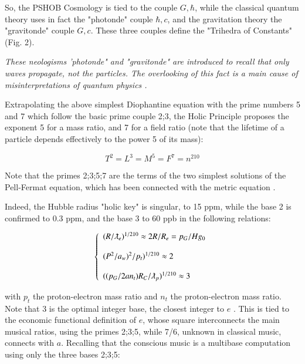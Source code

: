 \documentclass[a4paper,9pt]{article}
\begin{document}
So, the PSHOB Cosmology is tied to the couple $G,\hbar$, while the classical quantum theory uses in fact the "photonde" couple $\hbar,c$, and the gravitation theory the "gravitonde" couple $G,c$. These three couples define the "Trihedra of Constants"(Fig. 2).

\textit{These neologisms 'photonde" and "gravitonde" are introduced to recall that only waves propagate, not the particles. The overlooking of this fact is a main cause of misinterpretations of quantum physics .}




Extrapolating the above simplest Diophantine equation with the prime numbers 5 and 7 which follow the basic prime couple 2;3, the Holic Principle proposes the exponent 5 for a mass ratio, and 7 for a field ratio (note that the lifetime of a particle depends effectively to the power 5 of its mass):

\begin{equation}
T^2 = L^3 = M^5 = F^7 = n^{210}
 \end{equation}
 
 Note that the primes 2;3;5;7 are the terms of the two simplest solutions of the Pell-Fermat equation, which has been connected with the metric equation \cite{Sanchez1}. 
 
 Indeed, the Hubble radius "holic key" is singular, to 15 ppm, while the base 2 is confirmed to 0.3 ppm, and the base 3 to 60 ppb in the following relations:
 
 
 \begin{equation}
 \left\{
    \begin{array}{ll}
        (R/\lambdabar_e)^{1/210} \approx 2R/R_e = p_G/Hg_0 \\
    \\
        (P^2/a_w)^2/p_t)^{1/210}\approx 2\\
      \\  
        ((p_G/2an_t) R_C/\lambdabar_p)^{1/210} \approx 3
    \end{array}
\right.
\end{equation}




with $p_t$ the proton-electron mass ratio and $n_t$ the proton-electron mass ratio. Note that 3 is the optimal integer base, the closest integer to $e$ \cite{Hayes}. This is tied to the economic functional definition of $e$, whose square interconnects the main musical ratios, using the primes 2;3;5, while 7/6, unknown in classical music, connects with $a$. Recalling that the conscious music is a multibase computation using only the three bases 2;3;5: 
\end{document}
